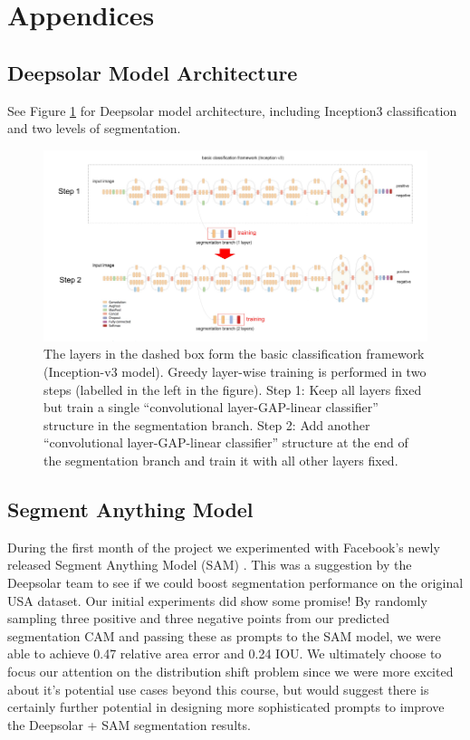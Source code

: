 \documentclass[10pt,twocolumn,letterpaper]{article}
\begin{document}
\newpage
\section{Appendices}
\subsection{Deepsolar Model Architecture}
See Figure \ref{fig:architecture} for Deepsolar model architecture, including Inception3 classification and two levels of segmentation. 
\begin{figure}[htp]
\centering
\includegraphics[width=15cm]{inception3.png}
\caption{The layers in the dashed box form the basic classification framework (Inception-v3 model). Greedy layer-wise training is performed in two steps (labelled in the left in the figure). Step 1: Keep all layers fixed but train a single “convolutional layer-GAP-linear classifier” structure in the segmentation branch. Step 2: Add another “convolutional layer-GAP-linear classifier” structure at the end of the segmentation branch and train it with all other layers fixed.\cite{DeepSolar1}}
\label{fig:architecture}
\end{figure}

\subsection{Segment Anything Model}
During the first month of the project we experimented with Facebook's newly released Segment Anything Model (SAM) \cite{kirillov2023segment}. This was a suggestion by the Deepsolar team to see if we could boost segmentation performance on the original USA dataset. Our initial experiments did show some promise! By randomly sampling three positive and three negative points from our predicted segmentation CAM and passing these as prompts to the SAM model, we were able to achieve 0.47 relative area error and 0.24 IOU. We ultimately choose to focus our attention on the distribution shift problem since we were more excited about it's potential use cases beyond this course, but would suggest there is certainly further potential in designing more sophisticated prompts to improve the Deepsolar + SAM segmentation results.  
\end{document}
